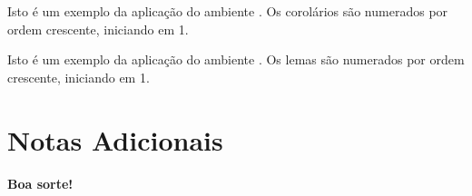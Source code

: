 \begin{corollary}
Isto é um exemplo da aplicação do ambiente . Os corolários são numerados por ordem crescente, iniciando em 1.
\end{corollary}

\begin{lemma}
Isto é um exemplo da aplicação do ambiente . Os lemas são numerados por ordem crescente, iniciando em 1.
\end{lemma}

\section{Notas Adicionais}

\textbf{Boa sorte!}


